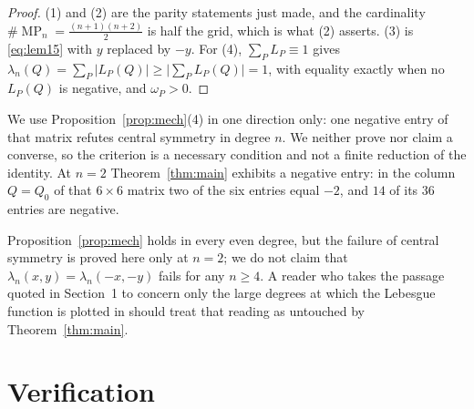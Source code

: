 \documentclass[11pt]{amsart}
\DeclareMathOperator{\MP}{MP}
\begin{document}
\begin{proof}
(1) and (2) are the parity statements just made, and the cardinality
$\#\MP_n=\frac{(n+1)(n+2)}2$ is half the grid, which is what (2) asserts.
(3) is \eqref{eq:lem15} with $y$ replaced by $-y$. For (4), $\sum_PL_P\equiv1$
gives $\lambda_n(Q)=\sum_P|L_P(Q)|\ge\bigl|\sum_PL_P(Q)\bigr|=1$, with equality
exactly when no $L_P(Q)$ is negative, and $\omega_P>0$.
\end{proof}

We use Proposition~\ref{prop:mech}(4) in one direction only: one negative entry
of that matrix refutes central symmetry in degree $n$. We neither prove nor
claim a converse, so the criterion is a necessary condition and not a finite
reduction of the identity. At $n=2$ Theorem~\ref{thm:main} exhibits a negative
entry: in the column $Q=Q_0$ of that $6\times6$ matrix two of the six entries
equal $-2$, and $14$ of its $36$ entries are negative.

Proposition~\ref{prop:mech} holds in every even degree, but the failure of
central symmetry is proved here only at $n=2$; we do not claim that
$\lambda_n(x,y)=\lambda_n(-x,-y)$ fails for any $n\ge4$. A reader who takes the
passage quoted in Section~1 to concern only the large degrees at which the
Lebesgue function is plotted in \cite{BBD} should treat that reading as
untouched by Theorem~\ref{thm:main}.

\section{Verification}
\end{document}
